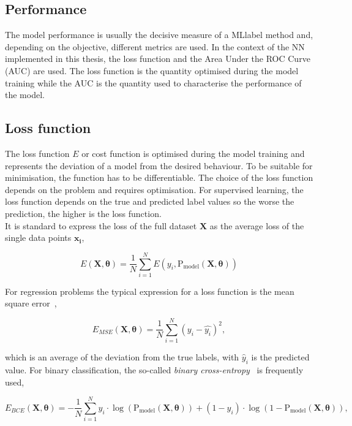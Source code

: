 \subsection{Performance}

The model performance is usually the decisive measure of a \acrshort{MLlabel} method and, depending on the objective, different metrics are used. In the context of the NN implemented in this thesis, the loss function and the Area Under the ROC Curve (AUC) are used. The loss function is the quantity optimised during the model training while the AUC is the quantity used to characterise the performance of the model.

\subsection{Loss function}

The loss function $E$ or cost function is optimised during the model training and represents the deviation of a model from the desired behaviour. To be suitable for minimisation, the function has to be differentiable. The choice of the loss function depends on the problem and requires optimisation. For supervised learning, the loss function depends on the true and predicted label values so the worse the prediction, the higher is the loss function.\\

It is standard to express the loss of the full dataset $\mathbf{X}$ as the average loss of the single data points $\mathbf{x_i}$,

\begin{equation}
    E(\mathbf{X},\boldsymbol{\theta})=\frac{1}{N}\sum_{i=1}^NE(y_i,\text{P}_\text{model}(\mathbf{X},\boldsymbol{\theta}))
\end{equation}

For regression problems the typical expression for a loss function is the mean square error~\cite{EncyclopediaofML}, 

\begin{equation}
    E_{MSE}(\mathbf{X},\boldsymbol{\theta}) = \frac{1}{N}\sum_{i=1}^N (y_i-\hat{y_i})^2,
\end{equation}

which is an average of the deviation from the true labels, with $\hat{y}_i$ is the predicted value. For binary classification, the so-called \textit{binary cross-entropy}~\cite{binarycross} is frequently used, 

\begin{equation}
    E_{BCE}(\mathbf{X},\boldsymbol{\theta}) = -\frac{1}{N}\sum_{i=1}^N y_i\cdot\log(\text{P}_\text{model}(\mathbf{X},\boldsymbol{\theta}))+(1-y_i)\cdot\log(1-\text{P}_\text{model}(\mathbf{X},\mathbf{\theta})),
\end{equation}

